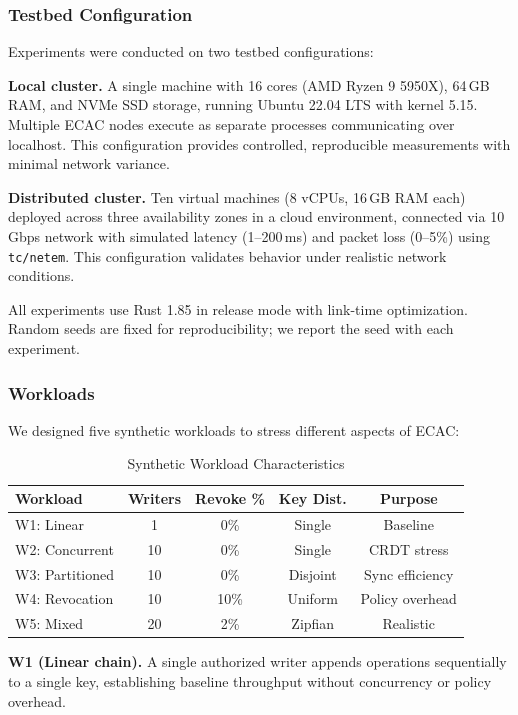 \subsubsection{Testbed Configuration}
Experiments were conducted on two testbed configurations:

\noindent\textbf{Local cluster.} A single machine with 16 cores (AMD Ryzen 9 5950X), 64\,GB RAM, and NVMe SSD storage, running Ubuntu 22.04 LTS with kernel 5.15. Multiple ECAC nodes execute as separate processes communicating over localhost. This configuration provides controlled, reproducible measurements with minimal network variance.

\noindent\textbf{Distributed cluster.} Ten virtual machines (8 vCPUs, 16\,GB RAM each) deployed across three availability zones in a cloud environment, connected via 10\,Gbps network with simulated latency (1--200\,ms) and packet loss (0--5\%) using \texttt{tc/netem}. This configuration validates behavior under realistic network conditions.

All experiments use Rust 1.85 in release mode with link-time optimization. Random seeds are fixed for reproducibility; we report the seed with each experiment.

\subsubsection{Workloads}
We designed five synthetic workloads to stress different aspects of ECAC:

\begin{table}[htbp]
\centering
\caption{Synthetic Workload Characteristics}
\label{tab:workloads}
\begin{tabular}{@{}lcccc@{}}
\toprule
\textbf{Workload} & \textbf{Writers} & \textbf{Revoke \%} & \textbf{Key Dist.} & \textbf{Purpose} \\
\midrule
W1: Linear      & 1  & 0\%  & Single   & Baseline \\
W2: Concurrent  & 10 & 0\%  & Single   & CRDT stress \\
W3: Partitioned & 10 & 0\%  & Disjoint & Sync efficiency \\
W4: Revocation  & 10 & 10\% & Uniform  & Policy overhead \\
W5: Mixed       & 20 & 2\%  & Zipfian  & Realistic \\
\bottomrule
\end{tabular}
\end{table}

\noindent\textbf{W1 (Linear chain).} A single authorized writer appends operations sequentially to a single key, establishing baseline throughput without concurrency or policy overhead.

